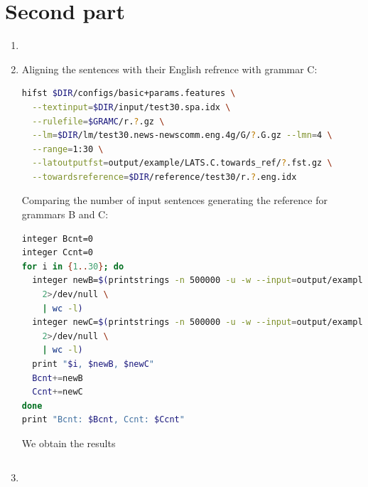 \documentclass[a4paper,oneside,reqno]{amsart}
\begin{document}
\section{Second part}

\begin{enumerate}[label=\arabic*.]
  \item

  \item
    Aligning the sentences with their English refrence with grammar C:

    \begin{lstlisting}[language=bash]
hifst $DIR/configs/basic+params.features \
  --textinput=$DIR/input/test30.spa.idx \
  --rulefile=$GRAMC/r.?.gz \
  --lm=$DIR/lm/test30.news-newscomm.eng.4g/G/?.G.gz --lmn=4 \
  --range=1:30 \
  --latoutputfst=output/example/LATS.C.towards_ref/?.fst.gz \
  --towardsreference=$DIR/reference/test30/r.?.eng.idx
    \end{lstlisting}

    Comparing the number of input sentences generating the reference
    for grammars B and C:

    \begin{lstlisting}[language=bash]
integer Bcnt=0
integer Ccnt=0
for i in {1..30}; do
  integer newB=$(printstrings -n 500000 -u -w --input=output/example/LATS.B.towards_ref/$i.fst.gz \
    2>/dev/null \
    | wc -l)
  integer newC=$(printstrings -n 500000 -u -w --input=output/example/LATS.C.towards_ref/$i.fst.gz \
    2>/dev/null \
    | wc -l)
  print "$i, $newB, $newC"
  Bcnt+=newB
  Ccnt+=newC
done
print "Bcnt: $Bcnt, Ccnt: $Ccnt"
    \end{lstlisting}

    We obtain the results %
    \begin{verbatim}
    \end{verbatim}

  \item
\end{enumerate}

%
%


\end{document}
